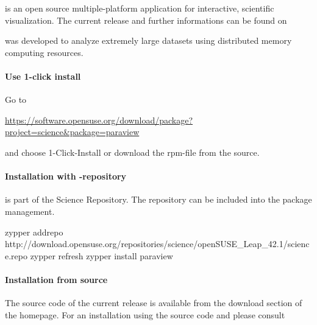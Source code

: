 % 
%               
%          
% 

\marktool{\paraviewname} is an open source multiple-platform application for interactive, scientific visualization. The current release and further informations can be found on

\href{\paraviewaddress}{\paraviewaddress}

\marktool{\paraviewname} was developed to analyze extremely large datasets using distributed memory computing resources.


\paragraph{Use 1-click install}

Go to

\href{https://software.opensuse.org/download/package?project=science\&package=paraview}{https://software.opensuse.org/download/package?project=science\&package=paraview}

and choose 1-Click-Install or download the rpm-file from the source.

\paragraph{Installation with \marktool{\opensusename}-repository} \marktool{\paraviewname} is part of the \marktool{\opensusename} Science Repository. The repository can be included into the package management.

\begingroup
\lstset{breaklines=true}
\begin{code}
zypper addrepo http://download.opensuse.org/repositories/science/openSUSE_Leap_42.1/science.repo
zypper refresh
zypper install paraview
\end{code}
\endgroup

\paragraph{Installation from source} The source code of the current \marktool{\paraviewname} release is available from the download section of the \marktool{\paraviewname} homepage. For an installation using the source code and \marktool{\cmakename} please consult

